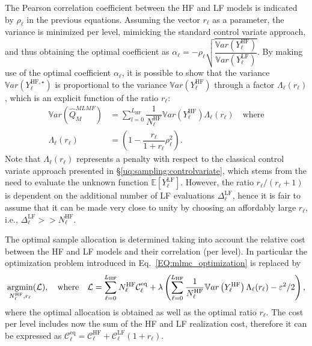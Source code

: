 The Pearson correlation coefficient between the HF and LF models is indicated by $\rho_\ell$ in the previous equations.
Assuming the vector $r_\ell$ as a parameter, the variance is minimized per level, mimicking the standard control variate 
approach, and thus obtaining the optimal coefficient as 
$\alpha_\ell = -\rho_\ell \sqrt{ \dfrac{ \mathbb{V}ar\left( Y^{\mathrm{HF}}_{\ell} \right) } 
                                { \mathbb{V}ar\left( Y^{\mathrm{LF}}_{\ell}  \right)     }}$. 
By making use of the optimal coefficient $\alpha_\ell$, it is possible to show that the variance $\mathbb{V}ar\left(Y^{\mathrm{HF},\star}_{\ell}\right)$ 
is proportional to the variance $\mathbb{V}ar\left(Y^{\mathrm{HF}}_{\ell}\right)$ through a factor $\Lambda_{\ell}(r_\ell)$, which is an explicit 
function of the ratio $r_\ell$:
\begin{equation}\label{EQ: MLMF variance}
\begin{split}
 \mathbb{V}ar\left(\hat{Q}_M^{MLMF}\right) &= \sum_{l=0}^{L_{\mathrm{HF}}} \dfrac{1}{N_{\ell}^{\mathrm{HF}}} \mathbb{V}ar\left(Y^{\mathrm{HF}}_{\ell}\right)
 \Lambda_{\ell}(r_\ell) \quad \mathrm{where} \\
 \Lambda_{\ell}(r_\ell) &= \left( 1 - \dfrac{r_\ell}{1+r_\ell}\rho_\ell^2 \right).
\end{split}
\end{equation}
Note that $\Lambda_{\ell}(r_\ell)$ represents a penalty with respect to the classical 
control variate approach presented in \S\ref{uq:sampling:controlvariate}, which stems from 
the need to evaluate the unknown function $\mathbb{E}\left[Y^{\mathrm{LF}}_{\ell}\right]$. However, the ratio $r_\ell/(r_\ell+1)$ is dependent 
on the additional number of LF evaluations $\Delta_{\ell}^{\mathrm{LF}}$, hence it is fair to assume that it 
can be made very close to unity by choosing an affordably large $r_\ell$, i.e., $\Delta_{\ell}^{\mathrm{LF}} >> N_{\ell}^{\mathrm{HF}}$.

The optimal sample allocation is determined taking into account the relative cost between the HF and LF models and their correlation (per level).
In particular the optimization problem introduced in Eq.~\ref{EQ:mlmc_optimization} is replaced by
 \begin{equation*}
  \operatornamewithlimits{argmin}\limits_{N_{\ell}^{\mathrm{HF}}, r_\ell}(\mathcal{L}), \quad \mathrm{where} \quad \mathcal{L} = \sum_{\ell=0}^{L_{\mathrm{HF}}} N_{\ell}^{\mathrm{HF}} \mathcal{C}_{\ell}^{\mathrm{eq}} +
                 \lambda \left( \sum_{\ell=0}^{L_{\mathrm{HF}}} \dfrac{1}{N_{\ell}^{\mathrm{HF}}}\mathbb{V}ar\left( Y^{\mathrm{HF}}_{\ell}\right) \Lambda_{\ell}(r_\ell) - \varepsilon^2/2 \right),
 \end{equation*}
where the optimal allocation is obtained as well as the optimal ratio $r_\ell$. The cost per level includes now the sum of the HF and LF realization cost,
therefore it can be expressed as $\mathcal{C}_{\ell}^{\mathrm{eq}} = \mathcal{C}_{\ell}^{\mathrm{HF}} + \mathcal{C}_{\ell}^{\mathrm{LF}} (1+r_\ell)$.

